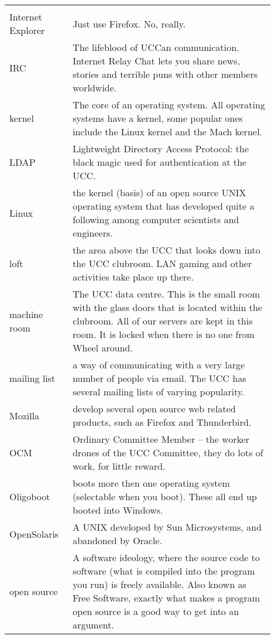 \pagebreak

\small{
\begin{tabular}{p{0.2\linewidth}|p{0.7\linewidth}}
	\rowcolor{black} \color{white}{Term} & \color{white}{Translation} \\

Internet Explorer &
Just use Firefox. No, really. \\
IRC &
The lifeblood of UCCan communication. Internet Relay Chat lets you share news, stories and terrible puns with other members worldwide. \\
kernel &
The core of an operating system. All operating systems have a kernel, some popular ones include the Linux kernel and the Mach kernel. \\
LDAP &
Lightweight Directory Access Protocol: the black magic used for authentication at the UCC. \\
Linux &
the kernel (basis) of an open source UNIX operating system that has developed quite a following among computer scientists and engineers. \\
loft &
the area above the UCC that looks down into the UCC clubroom. LAN gaming and other activities take place up there. \\
machine room &
The UCC data centre. This is the small room with the glass doors that is located within the clubroom. All of our servers are kept in this room. It is locked when there is no one from Wheel around. \\
mailing list &
a way of communicating with a very large number of people via email. The UCC has several mailing lists of varying popularity. \\
Mozilla &
develop several open source web related products, such as Firefox and Thunderbird. \\
OCM &
Ordinary Committee Member -- the worker drones of the UCC Committee, they do lots of work, for little reward. \\
Oligoboot &
boots more then one operating system (selectable when you boot). These all end up booted into Windows. \\

OpenSolaris &
A UNIX developed by Sun Microsystems, and abandoned by Oracle. \\
open source &
A software ideology, where the source code to software (what is compiled into the program you run) is freely available. Also known as Free Software, exactly what makes a program open source is a good way to get into an argument. \\


\end{tabular}}

